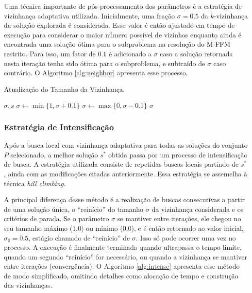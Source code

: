 \documentclass{MO824}
\begin{document}
    Uma técnica importante de pós-processamento dos parâmetros é a estratégia de vizinhança adaptativa utilizada. Inicialmente, uma fração $\sigma = 0.5$ da $k$-vizinhança da solução explorada é considerada. Esse valor é então ajustado em tempo de execução para considerar o maior número possível de vizinhos enquanto ainda é encontrada uma solução ótima para o subproblema na resolução do M-FFM restrito. Para isso, um fator de $0.1$ é adicionado a $\sigma$ caso a solução retornada nesta iteração tenha sido ótima para o subproblema, e subtraído de $\sigma$ caso contrário. O Algoritmo \ref{alg:neighbor} apresenta esse processo.
    
    \begin{algorithm}[H]
    \caption{Atualização do Tamanho da Vizinhança.}
    \label{alg:neighbor}
    \begin{algorithmic}[1]
        \REQUIRE $\sigma, s$
            \STATE $\sigma \leftarrow \min\{1, \sigma+0.1\}$ 
        \ELSE
            \STATE $\sigma \leftarrow \max\{0, \sigma-0.1\}$
        \ENDIF
        \RETURN $\sigma$
    \end{algorithmic}
    \end{algorithm}
    
    \subsubsection{Estratégia de Intensificação}
    Após a busca local com vizinhança adaptativa para todas as soluções do conjunto $P$ selecionado, a melhor solução $s^*$ obtida passa por um processo de intensificação de busca. A estratégia utilizada consiste de repetidas buscas locais partindo de $s^*$, ainda com as modificações citadas anteriormente. Essa estratégia se assemelha à técnica \textit{hill climbing}.
    
    A principal diferença desse método é a realização de buscas consecutivas a partir de uma solução única, o ``reinício'' do tamanho $\sigma$ da vizinhança considerada e os critérios de parada. Se o parâmetro $\sigma$ se mantiver entre iterações, ele chegou no seu tamanho máximo ($1.0$) ou mínimo ($0.0$), e é então retornado ao valor inicial, $\sigma_0 = 0.5$, estágio chamado de ``reinício'' de $\sigma$. Isso só pode ocorrer uma vez no processo. A execução é finalmente terminada quando ultrapassa o tempo limite, quando um segundo ``reinício'' for necessário, ou quando a vizinhança se mantiver entre iterações (convergência). O Algoritmo \ref{alg:intense} apresenta esse método de modo simplificado, omitindo detalhes como alocação de tempo e construção das vizinhanças.
    
\end{document}
